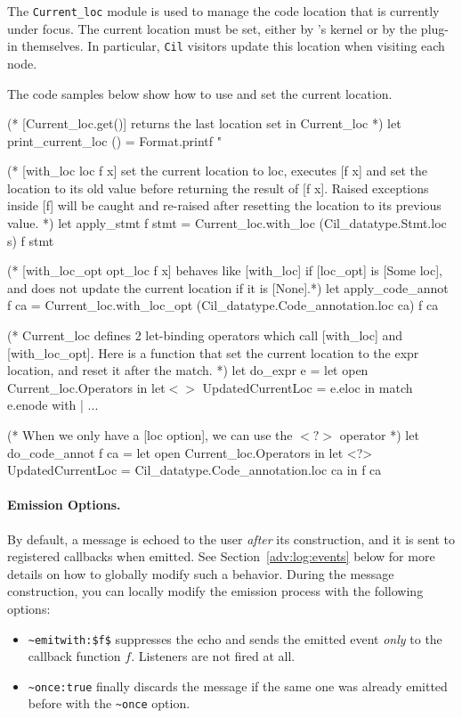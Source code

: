 The \texttt{Current\_loc} module is used to
manage the code location that is currently under focus.
The current location must be set, either by \framac's kernel or by
the plug-in themselves. In particular, \texttt{Cil} visitors update this
location when visiting each node.

\begin{example}
The code samples below show how to use and set the current location.
  \begin{ocamlcode}
  (* [Current_loc.get()] returns the last location set in Current_loc *)
  let print_current_loc () =
    Format.printf "%

  (* [with_loc loc f x] set the current location to loc, executes [f x] and set
     the location to its old value before returning the result of [f x]. Raised
     exceptions inside [f] will be caught and re-raised after resetting the
     location to its previous value. *)
  let apply_stmt f stmt =
    Current_loc.with_loc (Cil_datatype.Stmt.loc s) f stmt

  (* [with_loc_opt opt_loc f x] behaves like [with_loc] if [loc_opt] is
     [Some loc], and does not update the current location if it is [None].*)
  let apply_code_annot f ca =
    Current_loc.with_loc_opt (Cil_datatype.Code_annotation.loc ca) f ca

  (* Current_loc defines 2 let-binding operators which call [with_loc] and
     [with_loc_opt]. Here is a function that set the current location to the
     expr location, and reset it after the match. *)
  let do_expr e =
    let open Current_loc.Operators in
    let$<>$ UpdatedCurrentLoc = e.eloc in
    match e.enode with
    | ...

  (* When we only have a [loc option], we can use the $<?>$ operator *)
  let do_code_annot f ca =
    let open Current_loc.Operators in
    let <?> UpdatedCurrentLoc = Cil_datatype.Code_annotation.loc ca in
    f ca
  \end{ocamlcode}
  \end{example}

\paragraph{Emission Options.} By default, a message is echoed to the
user \emph{after} its construction, and it is sent to registered
callbacks when emitted. See Section~\ref{adv:log:events} below for
more details on how to globally modify such a behavior. During the
message construction, you can locally modify the emission process with
the following options:
\begin{itemize}
\item[] \lstinline{~emitwith:$f$} suppresses the echo and sends the
  emitted event \emph{only} to the callback function $f$. Listeners
  are not fired at all.
\item[] \lstinline{~once:true} finally discards the message if the
  same one was already emitted before with the \lstinline{~once}
  option.
\end{itemize}

